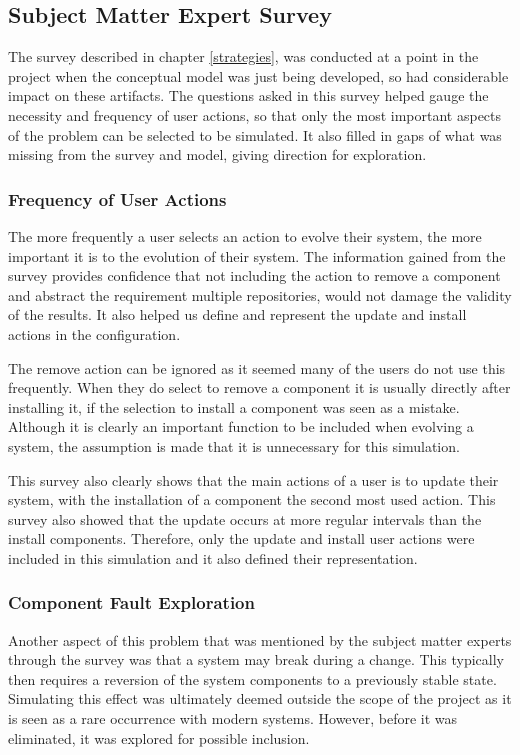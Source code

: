 \subsection{Subject Matter Expert Survey}
The survey described in chapter \ref{strategies}, 
was conducted at a point in the project when the conceptual model was just being developed, so had considerable impact on these artifacts.
The questions asked in this survey helped gauge the necessity and frequency of user actions,
so that only the most important aspects of the problem can be selected to be simulated.
It also filled in gaps of what was missing from the survey and model, giving direction for exploration.

\subsubsection{Frequency of User Actions}
The more frequently a user selects an action to evolve their system, the more important it is to the evolution of their system.
The information gained from the survey provides confidence that not including the action to remove a component and abstract the requirement multiple repositories, 
would not damage the validity of the results.
It also helped us define and represent the update and install actions in the configuration.

The remove action can be ignored as it seemed many of the users do not use this frequently.
When they do select to remove a component it is usually directly after installing it, if the selection to install a component was seen as a mistake.
Although it is clearly an important function to be included when evolving a system, the assumption is made that it is unnecessary for this simulation.

This survey also clearly shows that the main actions of a user is to update their system,
with the installation of a component the second most used action.
This survey also showed that the update occurs at more regular intervals than the install components.
Therefore, only the update and install user actions were included in this simulation and it also defined their representation. 

\subsubsection{Component Fault Exploration}
Another aspect of this problem that was mentioned by the subject matter experts through the survey was that a system may break during a change.
This typically then requires a reversion of the system components to a previously stable state.
Simulating this effect was ultimately deemed outside the scope of the project as it is seen as a rare occurrence with modern systems.
However, before it was eliminated, it was explored for possible inclusion.

